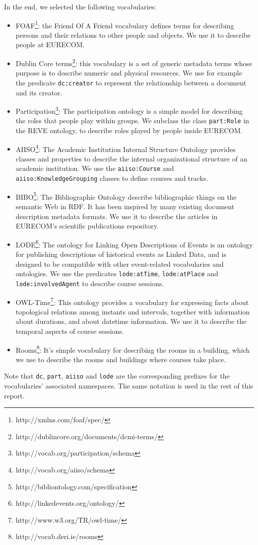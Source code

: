 \documentclass[a4paper,11pt]{report}
\begin{document}
In the end, we selected the following vocabularies: 
\begin{itemize}
\item FOAF\footnote{http://xmlns.com/foaf/spec/}: the Friend Of A Friend vocabulary defines terms for describing persons and their relations to other people and objects. We use it to describe people at \mbox{EURECOM}. 
\item Dublin Core terms\footnote{http://dublincore.org/documents/dcmi-terms/}: this vocabulary is a set of generic metadata terms whose purpose is to describe numeric and physical resources. We use for example the predicate \texttt{dc:creator} to represent the relationship between a document and its creator. 
\item Participation\footnote{http://vocab.org/participation/schema}: The participation ontology is a simple model for describing the roles that people play within groups. We subclass the class \texttt{part:Role} in the REVE ontology, to describe roles played by people inside \mbox{EURECOM}. 
\item AIISO\footnote{http://vocab.org/aiiso/schema}: The Academic Institution Internal Structure Ontology provides classes and properties to describe the internal organizational structure of an academic institution. We use the \texttt{aiiso:Course} and \texttt{aiiso:KnowledgeGrouping} classes to define courses and tracks. 
\item BIBO\footnote{http://bibliontology.com/specification}:  The Bibliographic Ontology describe bibliographic things on the semantic Web in RDF. It has been inspired by many existing document description metadata formats. We use it to describe the articles in \mbox{EURECOM}'s scientific publications repository. 
\item LODE\footnote{http://linkedevents.org/ontology/}: The ontology for Linking Open Descriptions of Events is an ontology for publishing descriptions of historical events as Linked Data, and is designed to be compatible with other event-related vocabularies and ontologies. We use the predicates \texttt{lode:atTime}, \texttt{lode:atPlace} and \texttt{lode:involvedAgent} to describe course sessions. 
\item OWL-Time\footnote{http://www.w3.org/TR/owl-time/}: This ontology provides a vocabulary for expressing facts about topological relations among instants and intervals, together with information about durations, and about datetime information. We use it to describe the temporal aspects of course sessions. 
\item Rooms\footnote{http://vocab.deri.ie/rooms}: It's simple vocabulary for describing the rooms in a building, which we use to describe the rooms and buildings where courses take place. 
\end{itemize}
Note that \texttt{dc},  \texttt{part},  \texttt{aiiso} and  \texttt{lode} are the corresponding prefixes for the vocabularies' associated namespaces. The same notation is used in the rest of this report. 
\end{document}
